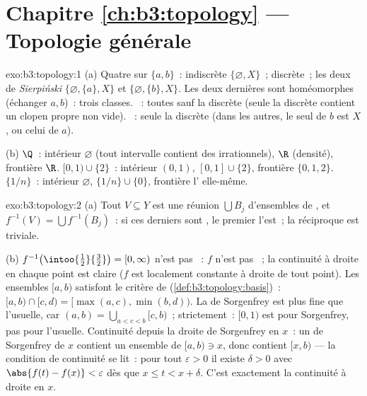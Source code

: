 \section*{Chapitre \ref{ch:b3:topology} --- Topologie générale}

\begin{solution}{exo:b3:topology:1}
(a) Quatre  sur $\{a,b\}$~: indiscrète
$\{\varnothing, X\}$~; discrète~; les deux  de
\emph{Sierpiński} $\{\varnothing, \{a\}, X\}$ et
$\{\varnothing, \{b\}, X\}$. Les deux dernières sont
homéomorphes (échanger $a, b$)~: trois classes. ~:
toutes sauf la discrète (seule la  discrète contient
un clopen propre non vide). ~: seule la discrète (dans
les autres, le seul  de $b$ est $X$, ou celui de
$a$).

(b) $\Q$~: intérieur $\varnothing$ (tout intervalle contient
des irrationnels),  $\R$ (densité), frontière $\R$.
$[0,1) \cup \{2\}$~: intérieur $(0,1)$, 
$[0,1]\cup\{2\}$, frontière $\{0, 1, 2\}$. $\{1/n\}$~:
intérieur $\varnothing$,  $\{1/n\}\cup\{0\}$,
frontière l' elle-même.
\end{solution}

\begin{solution}{exo:b3:topology:2}
(a) Tout  $V \subseteq Y$ est une réunion $\bigcup B_j$
d'ensembles de , et $f^{-1}(V) = \bigcup f^{-1}(B_j)$~: si
ces derniers sont , le premier l'est~; la réciproque
est triviale.

(b) $f^{-1}\bigl(\intoo{\frac12}{\frac32}\bigr) = [0, \infty)$
n'est pas ~: $f$ n'est pas ~; la continuité à
droite en chaque point est claire ($f$ est localement
constante à droite de tout point). Les ensembles $[a, b)$
satisfont le critère de 
(\cref{def:b3:topology:basis})~: $[a,b)\cap[c,d) =
[\max(a,c), \min(b,d))$. La  de Sorgenfrey est plus
fine que l'usuelle, car $(a, b) = \bigcup_{a < c < b}[c,
b)$~; strictement~: $[0,1)$ est  pour Sorgenfrey, pas
pour l'usuelle. Continuité depuis la droite de Sorgenfrey en
$x$~: un  de Sorgenfrey de $x$ contient un ensemble
de  $[a, b) \ni x$, donc contient $[x, b)$ --- la
condition de continuité se lit~: pour tout $\varepsilon > 0$
il existe $\delta > 0$ avec $\abs{f(t) - f(x)} < \varepsilon$
dès que $x \leq t < x + \delta$. C'est exactement la
continuité à droite en $x$.
\end{solution}

